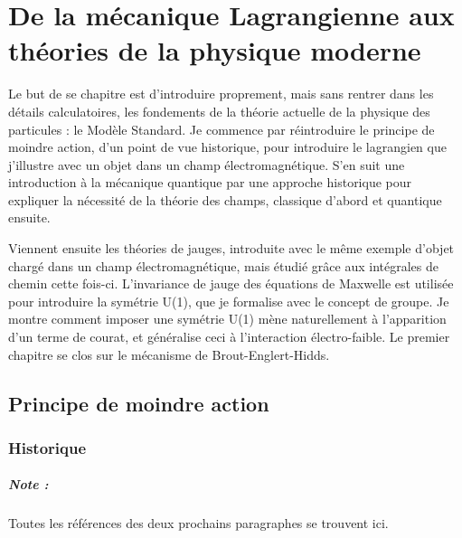 \chapter{De la mécanique Lagrangienne aux théories de la physique moderne}

    Le but de se chapitre est d'introduire proprement, mais sans rentrer dans les détails calculatoires, les fondements de la théorie actuelle de la physique des particules : le Modèle Standard. Je commence par réintroduire le principe de moindre action, d'un point de vue historique, pour introduire le lagrangien que j'illustre avec un objet dans un champ électromagnétique. S'en suit une introduction à la mécanique quantique par une approche historique pour expliquer la nécessité de la théorie des champs, classique d'abord et quantique ensuite. 
    
    Viennent ensuite les théories de jauges, introduite avec le même exemple d'objet chargé dans un champ électromagnétique, mais étudié grâce aux intégrales de chemin cette fois-ci. L'invariance de jauge des équations de Maxwelle est utilisée pour introduire la symétrie U(1), que je formalise avec le concept de groupe. Je montre comment imposer une symétrie U(1) mène naturellement à l'apparition d'un terme de courat, et généralise ceci à l'interaction électro-faible. Le premier chapitre se clos sur le mécanisme de Brout-Englert-Hidds.

    \newpage
    
    \section{Principe de moindre action}
        \subsection{Historique}
            \paragraph{Note : }Toutes les références des deux prochains paragraphes se trouvent ici\cite{least_action}.
                

